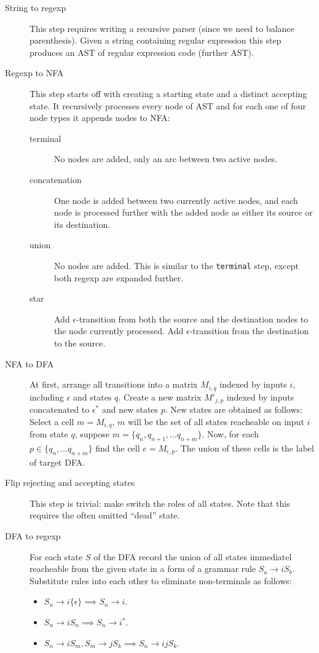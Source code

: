 \documentclass[11pt]{article}
\begin{document}
\begin{description}
\item[{String to regexp}] This step requires writing a recursive parser (since
we need to balance parenthesis).  Given a string containing regular
expression this step produces an AST of regular expression code
(further AST).
\item[{Regexp to NFA}] This step starts off with creating a starting state and a
distinct accepting state.  It recursively processes every node of AST
and for each one of four node types it appends nodes to NFA:
\begin{description}
\item[{terminal}] No nodes are added, only an arc between two active nodes.
\item[{concatenation}] One node is added between two currently active nodes,
and each node is processed further with the added node as either its
source or its destination.
\item[{union}] No nodes are added.  This is similar to the \texttt{terminal} step,
except both regexp are expanded further.
\item[{star}] Add \(\epsilon\)-transition from both the source and the
destination nodes to the node currently processed.  Add
\(\epsilon\)-transition from the destination to the source.
\end{description}
\item[{NFA to DFA}] At first, arrange all transitions into a matrix \(M_{i,q}\)
indexed by inputs \(i\), including \(\epsilon\) and states \(q\).  Create a
new matrix \(M'_{j,p}\) indexed by inputs concatenated to \(\epsilon^*\)
and new states \(p\).  New states are obtained as follows: Select a cell
\(m = M_{i,q}\), \(m\) will be the set of all states reacheable on input
\(i\) from state \(q\), suppose \(m = \{q_n, q_{n+1}, \dots q_{n+m}\}\).
Now, for each \(p \in \{q_n, \dots q_{n+m}\}\) find the cell \(e =
         M_{\epsilon, p}\).  The union of these cells is the label of target DFA.
\item[{Flip rejecting and accepting states}] This step is trivial: make switch
the roles of all states.  Note that this requires the often omitted
``dead'' state.
\item[{DFA to regexp}] For each state \(S\) of the DFA record the union of all
states immediatel reacheable from the given state in a form of a
grammar rule \(S_a \to iS_b\).  Substitute rules into each other to
eliminate non-terminals as follows:
\begin{itemize}
\item \(S_n \to i\{\epsilon\} \implies S_n \to i\).
\item \(S_n \to iS_n \implies S_n \to i^*\).
\item \(S_n \to iS_m, S_m \to jS_k \implies S_n \to ijS_k\).


\end{itemize}
\end{description}
\end{document}
